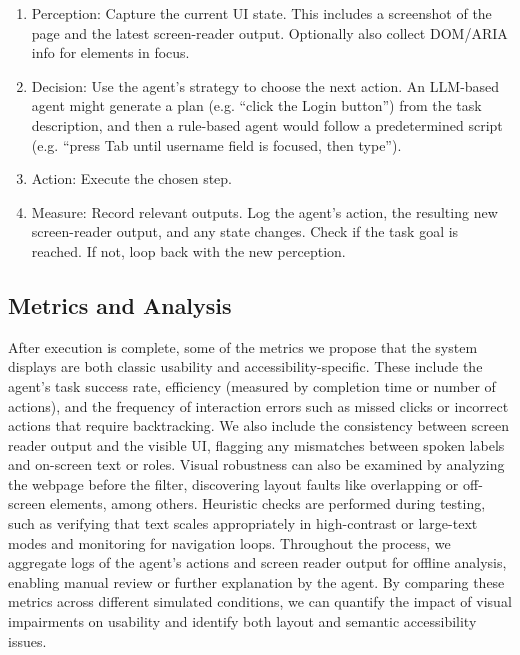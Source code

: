 \begin{enumerate}
    \item Perception: Capture the current \ac{UI} state. This includes a screenshot of the page and the latest screen-reader output. Optionally also collect DOM/ARIA info for elements in focus. 
    \item Decision: Use the agent's strategy to choose the next action. An LLM-based agent might generate a plan (e.g. “click the Login button”) from the task description, and then a rule-based agent would follow a predetermined script (e.g. “press Tab until username field is focused, then type”).
    \item Action: Execute the chosen step.
    \item Measure: Record relevant outputs. Log the agent's action, the resulting new screen-reader output, and any state changes. Check if the task goal is reached. If not, loop back with the new perception.
\end{enumerate}



\subsection{Metrics and Analysis}

After execution is complete, some of the metrics we propose that the system displays are both classic usability and accessibility-specific. These include the agent's task success rate, efficiency (measured by completion time or number of actions), and the frequency of interaction errors such as missed clicks or incorrect actions that require backtracking. We also include the consistency between screen reader output and the visible \ac{UI}, flagging any mismatches between spoken labels and on-screen text or roles. Visual robustness can also be examined by analyzing the webpage before the filter, discovering layout faults like overlapping or off-screen elements, among others. Heuristic checks are performed during testing, such as verifying that text scales appropriately in high-contrast or large-text modes and monitoring for navigation loops. Throughout the process, we aggregate logs of the agent's actions and screen reader output for offline analysis, enabling manual review or further explanation by the agent. By comparing these metrics across different simulated conditions, we can quantify the impact of visual impairments on usability and identify both layout and semantic accessibility issues.


